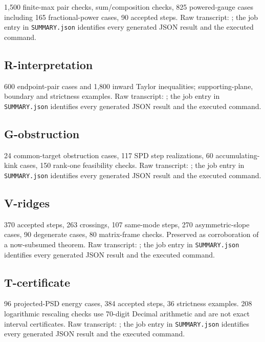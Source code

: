 \documentclass[10pt,oneside,openany]{book}
\theoremstyle{remark}\newtheorem{remark}{Remark}[chapter]
\begin{document}
1,500 finite-max pair checks, sum/composition checks, 825 powered-gauge cases including 165 fractional-power cases, 90 accepted steps. Raw transcript: ; the job entry in \texttt{SUMMARY.json} identifies every generated JSON result and the executed command.

\subsection{R-interpretation}\label{r-interpretation}

600 endpoint-pair cases and 1,800 inward Taylor inequalities; supporting-plane, boundary and strictness examples. Raw transcript: ; the job entry in \texttt{SUMMARY.json} identifies every generated JSON result and the executed command.

\subsection{G-obstruction}\label{g-obstruction}

24 common-target obstruction cases, 117 SPD step realizations, 60 accumulating-kink cases, 150 rank-one feasibility checks. Raw transcript: ; the job entry in \texttt{SUMMARY.json} identifies every generated JSON result and the executed command.

\subsection{V-ridges}\label{v-ridges}

370 accepted steps, 263 crossings, 107 same-mode steps, 270 asymmetric-slope cases, 90 degenerate cases, 80 matrix-frame checks. Preserved as corroboration of a now-subsumed theorem. Raw transcript: ; the job entry in \texttt{SUMMARY.json} identifies every generated JSON result and the executed command.

\subsection{T-certificate}\label{t-certificate}

96 projected-PSD energy cases, 384 accepted steps, 36 strictness examples. 208 logarithmic rescaling checks use 70-digit Decimal arithmetic and are not exact interval certificates. Raw transcript: ; the job entry in \texttt{SUMMARY.json} identifies every generated JSON result and the executed command.
\end{document}
